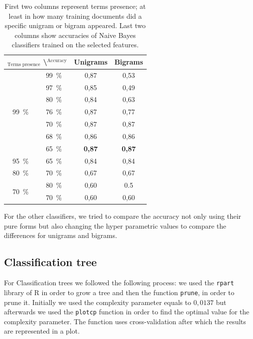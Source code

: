 \documentclass[a4paper,11pt]{article}
\begin{document}
\begin{table}[h!]
\centering
\begin{tabular}{c | c || c | c}
\multicolumn{2}{c||}{$_{\text{Terms presence}}$ \textbackslash $^{\text{Accuracy}}$} & Unigrams & Bigrams \\ \hline \hline
\multirow{7}{*}{99~\%} & 99~\% & 0{,}87 & 0{,}53 \\ \cline{2-4}
& 97~\% & 0{,}85 & 0{,}49 \\ \cline{2-4}
& 80~\% & 0{,}84 & 0{,}63 \\ \cline{2-4}
& 76~\% & 0{,}87 & 0{,}77 \\ \cline{2-4}
& 70~\% & 0{,}87 & 0{,}87 \\ \cline{2-4}
& 68~\% & 0{,}86 & 0{,}86 \\ \cline{2-4}
& 65~\% & \textbf{0{,}87} & \textbf{0{,}87} \\ \hline
95~\% & 65~\% & 0{,}84 & 0{,}84 \\ \hline
80~\% & 70~\% & 0{,}67 & 0{,}67 \\ \hline
\multirow{2}{*}{70~\%} & 80~\% & 0{,}60 & 0.5 \\ \cline{2-4}
& 70~\% & 0{,}60 & 0{,}60 \\ 
\end{tabular}
\caption{First two columns represent terms presence; at least in how many training documents did a specific unigram or bigram appeared. Last two columns show accuracies of Naive Bayes classifiers trained on the selected features.}
\label{tab: naiveBayes}
\end{table}

For the other classifiers, we tried to compare the accuracy not only using their pure forms but also changing the hyper parametric values to compare the differences for unigrams and bigrams. 

\subsection{Classification tree}

For Classification trees we followed the following process: we used the \verb|rpart| library of R \cite{rpart} in order to grow a tree and then the function \verb|prune|, in order to prune it. Initially we used the complexity parameter equals to  $0{,}0137$ but afterwards we used the \verb|plotcp| function in order to find the optimal value for the complexity parameter. The function uses cross-validation after which the results are represented in a plot.
\end{document}
